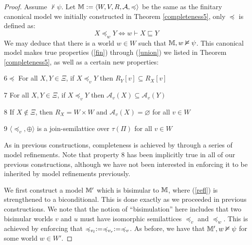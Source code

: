 \begin{proof}
  Assume $\nvdash \psi$.  Let $\mathbbm{M} \assign \langle W, V, R,
  \mathcal{A}, \preccurlyeq \rangle$ be the same as the finitary canonical
  model we initially constructed in Theorem \ref{completeness5}, only
  $\preccurlyeq$ is defined as:
  \[ X \preccurlyeq_w Y \Longleftrightarrow w \vdash X \sqsubseteq Y \]
  We may deduce that there is a world $w \in W$ such that $\mathbbm{M}, w
  \nvDash \psi$.  This canonical model makes true properties (\ref{fin})
  through (\ref{union}) we listed in Theorem \ref{completeness5}, as well as a
  certain new properties:
  
  \begin{descriptioncompact}
    \item[6$\preccurlyeq$] For all $X, Y \in \Xi$, if $X \preccurlyeq_v Y$
    then $R_Y [v] \subseteq R_X [v]$
    
    \item[7] For all $X, Y \in \Xi$, if $X \preccurlyeq_v Y$ then
    $\mathcal{A}_v (X) \subseteq \mathcal{A}_v (Y)$
    
    \item[8] If $X \nin \Xi$, then $R_X = W \times W$ and $\mathcal{A}_v (X) =
    \varnothing$ for all $v \in W$
    
    \item[9] $\langle \preccurlyeq_v, \oplus \rangle$ is a join-semilattice
    over $\tau (\Pi)$ for all $v \in W$
  \end{descriptioncompact}
  
  As in previous constructions, completeness is achieved by through a series
  of model refinements.  Note that property 8 has been implicitly true in all
  of our previous constructions, although we have not been interested in
  enforcing it to be inherited by model refinements previously.
  
  
  
  We first construct a model $\mathbbm{M}'$ which is bisimular to
  $\mathbbm{M}$, where (\ref{refl}) is strengthened to a biconditional.  This
  is done exactly as we proceeded in previous constructions. We note that the
  notion of ``bisimulation'' here includes that two bisimular worlds $v$ and
  $u$ must have isomorphic semilattices $\preccurlyeq_v$ and
  $\preccurlyeq_w$.  This is achieved by enforcing that $\preccurlyeq_{v_l}
  \assign \preccurlyeq_{v_r} \assign \preccurlyeq_v$. As before, we have that
  $\mathbbm{M}', w \nvDash \psi$ for some world $w \in W'$.
  
  
  

\end{proof}

